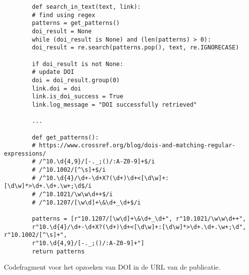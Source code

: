 \begin{listing}
    \begin{verbatim}
        def search_in_text(text, link):
        # find using regex
        patterns = get_patterns()
        doi_result = None
        while (doi_result is None) and (len(patterns) > 0):
        doi_result = re.search(patterns.pop(), text, re.IGNORECASE)
        
        if doi_result is not None:
        # update DOI
        doi = doi_result.group(0)
        link.doi = doi
        link.is_doi_success = True
        link.log_message = "DOI successfully retrieved"
        
        ...
        
        def get_patterns():
        # https://www.crossref.org/blog/dois-and-matching-regular-expressions/
        # /^10.\d{4,9}/[-._;()/:A-Z0-9]+$/i
        # /^10.1002/[^\s]+$/i
        # /^10.\d{4}/\d+-\d+X?(\d+)\d+<[\d\w]+:[\d\w]*>\d+.\d+.\w+;\d$/i
        # /^10.1021/\w\w\d++$/i
        # /^10.1207/[\w\d]+\&\d+_\d+$/i
        
        patterns = [r"10.1207/[\w\d]+\&\d+_\d+", r"10.1021/\w\w\d++",
        r"10.\d{4}/\d+-\d+X?(\d+)\d+<[\d\w]+:[\d\w]*>\d+.\d+.\w+;\d", r"10.1002/[^\s]+",
        r"10.\d{4,9}/[-._;()/:A-Z0-9]+"]
        return patterns
    \end{verbatim}
    \caption[Opzoeken van DOI in de URL van de publicatie]{Codefragment voor het opzoeken van DOI in de URL van de publicatie.}
    \label{code:Urlregex}
\end{listing}
